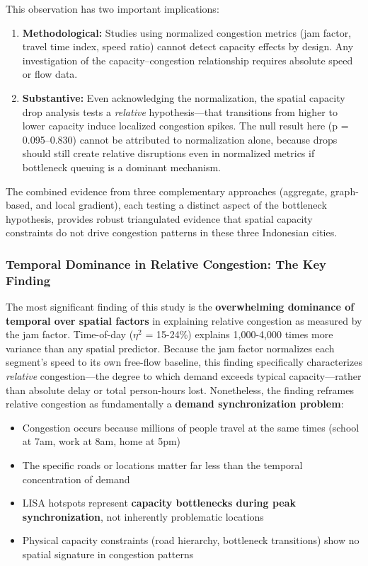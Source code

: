 \documentclass[12pt,a4paper]{article}
\begin{document}
This observation has two important implications:

\begin{enumerate}
\def\labelenumi{\arabic{enumi}.}
\item
  \textbf{Methodological:} Studies using normalized congestion metrics (jam factor, travel time index, speed ratio) cannot detect capacity effects by design. Any investigation of the capacity--congestion relationship requires absolute speed or flow data.
\item
  \textbf{Substantive:} Even acknowledging the normalization, the spatial capacity drop analysis tests a \emph{relative} hypothesis---that transitions from higher to lower capacity induce localized congestion spikes. The null result here (p = 0.095--0.830) cannot be attributed to normalization alone, because drops should still create relative disruptions even in normalized metrics if bottleneck queuing is a dominant mechanism.
\end{enumerate}

The combined evidence from three complementary approaches (aggregate, graph-based, and local gradient), each testing a distinct aspect of the bottleneck hypothesis, provides robust triangulated evidence that spatial capacity constraints do not drive congestion patterns in these three Indonesian cities.

\subsubsection{Temporal Dominance in Relative Congestion: The Key Finding}

The most significant finding of this study is the \textbf{overwhelming dominance of temporal over spatial factors} in explaining relative congestion as measured by the jam factor. Time-of-day ($\eta^2$ = 15-24\%) explains 1,000-4,000 times more variance than any spatial predictor. Because the jam factor normalizes each segment's speed to its own free-flow baseline, this finding specifically characterizes \emph{relative} congestion---the degree to which demand exceeds typical capacity---rather than absolute delay or total person-hours lost. Nonetheless, the finding reframes relative congestion as fundamentally a \textbf{demand synchronization problem}:

\begin{itemize}

\item
  Congestion occurs because millions of people travel at the same times (school at 7am, work at 8am, home at 5pm)
\item
  The specific roads or locations matter far less than the temporal concentration of demand
\item
  LISA hotspots represent \textbf{capacity bottlenecks during peak synchronization}, not inherently problematic locations
\item
  Physical capacity constraints (road hierarchy, bottleneck transitions) show no spatial signature in congestion patterns
\end{itemize}
\end{document}

